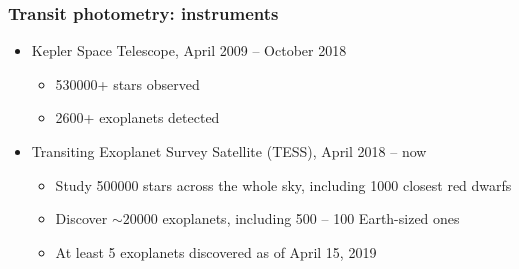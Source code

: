 \documentclass{beamer}
\begin{document}
\begin{frame}
\frametitle{Transit photometry: instruments}
\begin{itemize}
\item
Kepler Space Telescope, April 2009 -- October 2018
\begin{itemize}
\item 530000+ stars observed
\item 2600+ exoplanets detected
\end{itemize}
\item
Transiting Exoplanet Survey Satellite (TESS), April 2018 -- now
\begin{itemize}
\item Study 500000 stars across the whole sky, including 1000 closest red dwarfs
\item Discover $\sim 20000$ exoplanets, including 500 -- 100 Earth-sized ones
\item At least 5 exoplanets discovered as of April 15, 2019
\end{itemize}
\end{itemize}

\end{frame}
\end{document}
